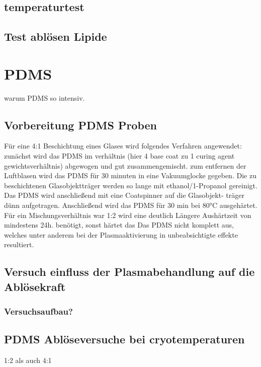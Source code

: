 \subsection{temperaturtest}

\subsection{Test ablösen Lipide}

\section{PDMS}

warum PDMS so intensiv.

\subsection{Vorbereitung PDMS Proben}

Für eine 4:1 Beschichtung eines Glases wird folgendes
Verfahren angewendet: zunächst wird das PDMS im
verhältnis (hier 4 base coat zu 1 curing agent gewichtsverhältnis)
abgewogen und gut zusammengemischt.
zum entfernen der Luftblasen wird das PDMS für
30 minuten in eine Vakuumglocke gegeben. Die
zu beschichtenen Glasobjektträger werden so lange mit
ethanol/1-Propanol gereinigt. Das PDMS wird
anschließend mit eine Coatspinner auf die Glasobjekt-
träger dünn aufgetragen. Anschließend wird das PDMS
für 30 min bei 80°C ausgehärtet.
Für ein Mischungsverhältnis war 1:2 wird eine deutlich
Längere Aushärtzeit von mindestens 24h. benötigt, sonst härtet das
Das PDMS nicht komplett aus, welches unter anderem bei der Plasmaaktivierung in unbeabsichtigte effekte resultiert. 

\subsection{Versuch einfluss der Plasmabehandlung auf die Ablösekraft}

\subsubsection{Versuchsaufbau?}

\subsection{PDMS Ablöseversuche bei cryotemperaturen}

1:2 als auch 4:1

